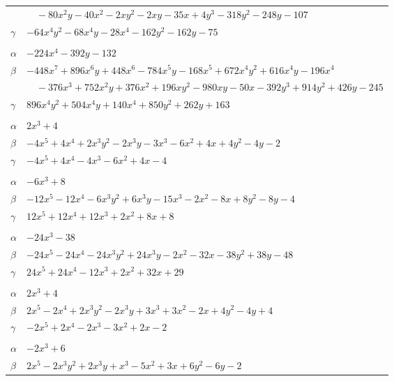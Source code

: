 \documentclass[11pt]{article}
\begin{document}
\begin{longtable}{@{}ll@{}}
 & $\quad -80x^{2}y-40x^{2}-2xy^{2}-2xy-35x+4y^{3}-318y^{2}-248y-107$\\
$\gamma$ & $-64x^{4}y^{2}-68x^{4}y-28x^{4}-162y^{2}-162y-75$\\
\addlinespace[3pt]
\multicolumn{2}{@{}l}{$\{i,j\}=\{1,33\}$, $k_{ij}=2^{4}\cdot 3^{2}$}\\
$\alpha$ & $-224x^{4}-392y-132$\\
$\beta$ & $-448x^{7}+896x^{6}y+448x^{6}-784x^{5}y-168x^{5}+672x^{4}y^{2}+616x^{4}y-196x^{4}$\\
 & $\quad -376x^{3}+752x^{2}y+376x^{2}+196xy^{2}-980xy-50x-392y^{3}+914y^{2}+426y-245$\\
$\gamma$ & $896x^{4}y^{2}+504x^{4}y+140x^{4}+850y^{2}+262y+163$\\
\addlinespace[3pt]
\multicolumn{2}{@{}l}{$\{i,j\}=\{2,14\}$, $k_{ij}=2^{2}$}\\
$\alpha$ & $2x^{3}+4$\\
$\beta$ & $-4x^{5}+4x^{4}+2x^{3}y^{2}-2x^{3}y-3x^{3}-6x^{2}+4x+4y^{2}-4y-2$\\
$\gamma$ & $-4x^{5}+4x^{4}-4x^{3}-6x^{2}+4x-4$\\
\addlinespace[3pt]
\multicolumn{2}{@{}l}{$\{i,j\}=\{2,16\}$, $k_{ij}=2^{3}$}\\
$\alpha$ & $-6x^{3}+8$\\
$\beta$ & $-12x^{5}-12x^{4}-6x^{3}y^{2}+6x^{3}y-15x^{3}-2x^{2}-8x+8y^{2}-8y-4$\\
$\gamma$ & $12x^{5}+12x^{4}+12x^{3}+2x^{2}+8x+8$\\
\addlinespace[3pt]
\multicolumn{2}{@{}l}{$\{i,j\}=\{2,26\}$, $k_{ij}=7^{2}$}\\
$\alpha$ & $-24x^{3}-38$\\
$\beta$ & $-24x^{5}-24x^{4}-24x^{3}y^{2}+24x^{3}y-2x^{2}-32x-38y^{2}+38y-48$\\
$\gamma$ & $24x^{5}+24x^{4}-12x^{3}+2x^{2}+32x+29$\\
\addlinespace[3pt]
\multicolumn{2}{@{}l}{$\{i,j\}=\{2,28\}$, $k_{ij}=2^{2}$}\\
$\alpha$ & $2x^{3}+4$\\
$\beta$ & $2x^{5}-2x^{4}+2x^{3}y^{2}-2x^{3}y+3x^{3}+3x^{2}-2x+4y^{2}-4y+4$\\
$\gamma$ & $-2x^{5}+2x^{4}-2x^{3}-3x^{2}+2x-2$\\
\addlinespace[3pt]
\multicolumn{2}{@{}l}{$\{i,j\}=\{2,29\}$, $k_{ij}=2^{4}$}\\
$\alpha$ & $-2x^{3}+6$\\
$\beta$ & $2x^{5}-2x^{3}y^{2}+2x^{3}y+x^{3}-5x^{2}+3x+6y^{2}-6y-2$\\

\end{longtable}
\end{document}
